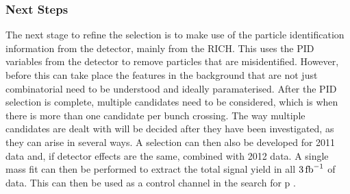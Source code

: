 \subsubsection{Next Steps}
\label{sec:next steps}

The next stage to refine the selection is to make use of the particle identification information from the \lhcb detector, mainly from the RICH.  This uses the PID variables from the \lhcb detector to remove particles that are misidentified. However, before this can take place the features in the background that are not just combinatorial need to be understood and ideally paramaterised.  After the PID selection is complete, multiple candidates need to be considered, which is when there is more than one \Bd candidate per bunch crossing.  The way multiple candidates are dealt with will be decided after they have been investigated, as they can arise in several ways. A selection can then also be developed for 2011 data and, if detector effects are the same, combined with 2012 data. A single mass fit can then be performed to extract the total signal yield in all $3\mbox{\,fb}^{-1}$ of data. This can then be used as a control channel in the search for \Lb \to p \Km \etaz.


\clearpage
